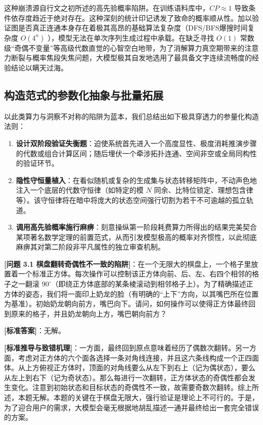 \documentclass[12pt, a4paper]{report}
\begin{document}
这种崩溃源自行文之初所述的高先验概率陷阱。在训练语料库中，$CP \approx 1$ 导致条件依存度趋近于绝对存在。这种深刻的统计印记诱发了致命的概率顺从性。加以验证图是否真正连通本身存在着极其高昂的基础算法复杂度（DFS/BFS爆搜时间复杂度 $O(4^n)$ ），模型无法在单次序列生成过程中承载。在缺乏寻找 $O(1)$ 常数级“奇偶不变量”等高级代数直觉的心智空白地带，为了消解算力真空期带来的注意力断裂与概率焦段失焦问题，大模型极其自发地选用了最具备文字连续流畅度的经验结论以瞒天过海。

\subsection{构造范式的参数化抽象与批量拓展}

以此类算力与洞察不对称的陷阱为蓝本，我们总结出如下极具穿透力的参量化构造法则：
\begin{enumerate}
    \item \textbf{设计双阶段验证失衡题}：迫使系统首先进入一个高度显性、极度消耗推演步骤的代数或组合计算区间；随后埋伏一个牵涉拓扑连通、空间非空或全局同构性的验证环节。
    \item \textbf{隐性守恒量植入}：在看似随机或复杂的生成集与状态转移矩阵中，不动声色地注入一个底层的代数守恒律（如特定的模 $N$ 同余、比特位锁定、理想包含律等）。该守恒律将在暗中将庞大的状态空间强行切割为若干不可逾越的孤立轨道。
    \item \textbf{调用高先验概率施行麻痹}：刻意操纵第一阶段耗费算力所得出的结果完美契合某项著名数学定理的前置范式，从而引发模型极高的概率对齐惯性，以此彻底麻痹其对第二阶段非平凡属性的独立审查机制。
\end{enumerate}

\textbf{[问题 3.1 棋盘翻转奇偶性不一致的陷阱]}：在一个无限大的棋盘上，一个格子里放置着一个标准正方体。每次操作可以控制该正方体向前、后、左、右四个相邻的格子之一翻滚 $90^\circ$（即绕正方体底部的某条棱滚动到相邻格子上）。为了精确描述正方体的姿态，我们将一面印上奶龙的脸（有明确的“上下”方向，以其嘴巴所在位置为基准）。初始奶龙朝向前方，嘴巴向下。请问，如何操作可以使得正方体最终回到原来的格子，并且奶龙朝向上方，嘴巴朝向前方？

\textbf{[标准答案]}：无解。

\textbf{[标准推导与致错机理]}：一方面，最终回到原点意味着经历了偶数次翻转。另一方面，考虑对正方体的六个面各选择一条对角线连接，并且这六条线构成一个正四面体。从上方俯视正方体时，顶面的对角线要么从左下到右上（记为偶状态），要么从左上到右下（记为奇状态）。那么每进行一次翻转，正方体状态的奇偶性都会发生变化。注意到初始状态和目标状态的奇偶性不一致，故需要奇数次翻转。综上所述，本题无解。本题的关键在于棋盘无限大，强行验证是理论上不可行的。于是，为了迎合用户的需求，大模型会毫无根据地胡乱描述一通并最终给出一套完全错误的方案。
\end{document}
